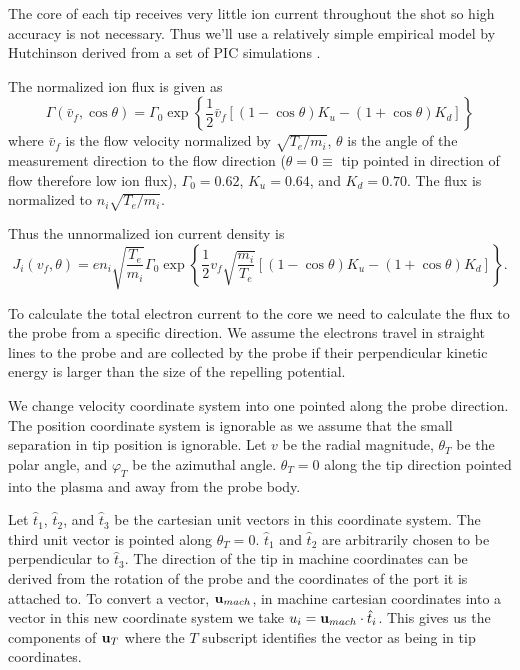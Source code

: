 The core of each tip receives very little ion current throughout the shot so high accuracy is not necessary. Thus we'll use a relatively simple empirical model by Hutchinson derived from a set of PIC simulations \cite{Hutchinson_mach_2002}.

The normalized ion flux is given as
\begin{equation}
    \Gamma(\bar{v}_f, \cos \theta) = \Gamma_0 \exp \left\{\frac{1}{2} \bar{v}_f \left[(1 - \cos \theta) K_u - (1 + \cos \theta) K_d\right]\right\}
\end{equation}
where $\bar{v}_f$ is the flow velocity normalized by $\sqrt{T_e / m_i}$, $\theta$ is the angle of the measurement direction to the flow direction ($\theta = 0 \equiv$ tip pointed in direction of flow therefore low ion flux), $\Gamma_0 = 0.62$, $K_u = 0.64$, and $K_d = 0.70$. The flux is normalized to $n_i \sqrt{T_e / m_i}$.

Thus the unnormalized ion current density is
\begin{equation}
    J_i(v_f, \theta) = e n_i \sqrt{\frac{T_e}{m_i}} \Gamma_0 \exp \left\{\frac{1}{2} v_f \sqrt{\frac{m_i}{T_e}} \left[(1 - \cos \theta) K_u - (1 + \cos \theta) K_d\right]\right\}.
    \label{eq:pa_ion_current_density_full}
\end{equation}


To calculate the total electron current to the core we need to calculate the flux to the probe from a specific direction. We assume the electrons travel in straight lines to the probe and are collected by the probe if their perpendicular kinetic energy is larger than the size of the repelling potential.


We change velocity coordinate system into one pointed along the probe direction. The position coordinate system is ignorable as we assume that the small separation in tip position is ignorable. Let $v$ be the radial magnitude, $\theta_T$ be the polar angle, and $\varphi_T$ be the azimuthal angle. $\theta_T = 0$ along the tip direction pointed into the plasma and away from the probe body.

Let $\hat{t}_1$, $\hat{t}_2$, and $\hat{t}_3$ be the cartesian unit vectors in this coordinate system. The third unit vector is pointed along $\theta_T = 0$. $\hat{t}_1$ and $\hat{t}_2$ are arbitrarily chosen to be perpendicular to $\hat{t}_3$. The direction of the tip in machine coordinates can be derived from the rotation of the probe and the coordinates of the port it is attached to. To convert a vector, $\vb{u}_{mach}$, in machine cartesian coordinates into a vector in this new coordinate system we take $u_i = \vb{u}_{mach} \cdot \hat{t}_i$. This gives us the components of $\vb{u}_T$ where the $T$ subscript identifies the vector as being in tip coordinates.

